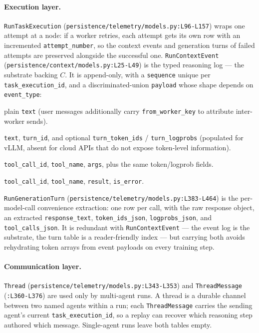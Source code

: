 \documentclass{article}
\begin{document}
\paragraph{Execution layer.} \texttt{RunTaskExecution}
(\texttt{persistence/telemetry/models.py:L96-L157}) wraps one
attempt at a node: if a worker retries, each attempt gets its
own row with an incremented \texttt{attempt\_number}, so the
context events and generation turns of failed attempts are
preserved alongside the successful one.
\texttt{RunContextEvent} (\texttt{persistence/context/models.py:L25-L49})
is the typed reasoning log --- the substrate backing $C$. It
is append-only, with a \texttt{sequence} unique per
\texttt{task\_execution\_id}, and a discriminated-union
\texttt{payload} whose shape depends on \texttt{event\_type}:
\begin{description}[leftmargin=0pt,itemindent=0pt,labelindent=0pt,labelsep=0.4em,itemsep=1pt,topsep=2pt,parsep=0pt,font=\normalfont\bfseries]
\sloppy
\item[system\_prompt, user\_message:] plain \texttt{text}
  (user messages additionally carry \texttt{from\_worker\_key}
  to attribute inter-worker sends).
\item[assistant\_text, thinking:] \texttt{text},
  \texttt{turn\_id}, and optional \texttt{turn\_token\_ids} /
  \texttt{turn\_logprobs} (populated for vLLM, absent for
  cloud APIs that do not expose token-level information).
\item[tool\_call:] \texttt{tool\_call\_id}, \texttt{tool\_name},
  \texttt{args}, plus the same token/logprob fields.
\item[tool\_result:] \texttt{tool\_call\_id},
  \texttt{tool\_name}, \texttt{result}, \texttt{is\_error}.
\end{description}
\texttt{RunGenerationTurn}
(\texttt{persistence/telemetry/models.py:L383-L464}) is the
per-model-call convenience extraction: one row per call, with
the raw response object, an extracted \texttt{response\_text},
\texttt{token\_ids\_json}, \texttt{logprobs\_json}, and
\texttt{tool\_calls\_json}. It is redundant with
\texttt{RunContextEvent} --- the event log is the substrate,
the turn table is a reader-friendly index --- but carrying
both avoids rehydrating token arrays from event payloads on
every training step.

\paragraph{Communication layer.} \texttt{Thread}
(\texttt{persistence/telemetry/models.py:L343-L353}) and
\texttt{ThreadMessage} (\texttt{:L360-L376}) are used only by
multi-agent runs. A thread is a durable channel between two
named agents within a run; each \texttt{ThreadMessage} carries
the sending agent's current \texttt{task\_execution\_id}, so a
replay can recover which reasoning step authored which
message. Single-agent runs leave both tables empty.
\end{document}
